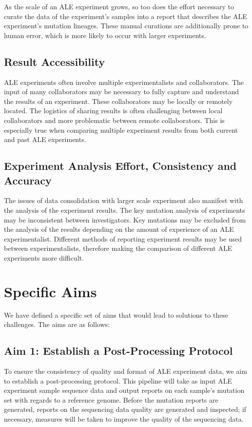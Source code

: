 \documentclass[12pt,final,masters,chapterheads]{ucsd}  %
\begin{document}
As the scale of an ALE experiment grows, so too does the effort necessary to curate the data of the experiment's samples into a report that describes the ALE experiment's mutation lineages. These manual curations are additionally prone to human error, which is more likely to occur with larger experiments.

\subsection{Result Accessibility}

ALE experiments often involve multiple experimentalists and collaborators. The input of many collaborators may be necessary to fully capture and understand the results of an experiment. These collaborators may be locally or remotely located. The logistics of sharing results is often challenging between local collaborators and more problematic between remote collaborators. This is especially true when comparing multiple experiment results from both current and past ALE experiments.

\subsection{Experiment Analysis Effort, Consistency and Accuracy}

The issues of data consolidation with larger scale experiment also manifest with the analysis of the experiment results. The key mutation analysis of experiments may be inconsistent between investigators. Key mutations may be excluded from the analysis of the results depending on the amount of experience of an ALE experimentalist. Different methods of reporting experiment results may be used between experimentalists, therefore making the comparison of different ALE experiments more difficult.


\section{Specific Aims}

We have defined a specific set of aims that would lead to solutions to these challenges. The aims are as follows:
\subsection{Aim 1: Establish a Post-Processing Protocol}
To ensure the consistency of quality and format of ALE experiment data, we aim to establish a post-processing protocol. This pipeline will take as input ALE experiment sample sequence data and output reports on each sample's mutation set with regards to a reference genome. Before the mutation reports are generated, reports on the sequencing data quality are generated and inspected; if necessary, measures will be taken to improve the quality of the sequencing data.
\end{document}
